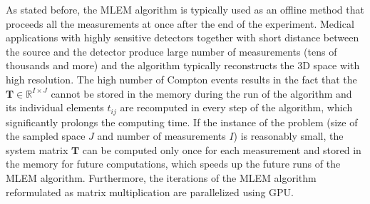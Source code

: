 As stated before, the \ac{MLEM} algorithm is typically used as an offline method that proceeds all the measurements at once after the end of the experiment.
Medical applications with highly sensitive detectors together with short distance between the source and the detector produce large number of measurements (tens of thousands and more) and the algorithm typically reconstructs the 3D space with high resolution.
The high number of Compton events results in the fact that the $\mathbf{T}\in \mathbb{R}^{I \times J}$ cannot be stored in the memory during the run of the algorithm and its individual elements $t_{ij}$ are recomputed in every step of the algorithm, which significantly prolongs the computing time.
If the instance of the problem (size of the sampled space $J$ and number of measurements $I$) is reasonably small, the system matrix $\mathbf{T}$ can be computed only once for each measurement and stored in the memory for future computations, which speeds up the future runs of the \ac{MLEM} algorithm.
Furthermore, the iterations of the \ac{MLEM} algorithm reformulated as matrix multiplication are parallelized using \ac{GPU}.

